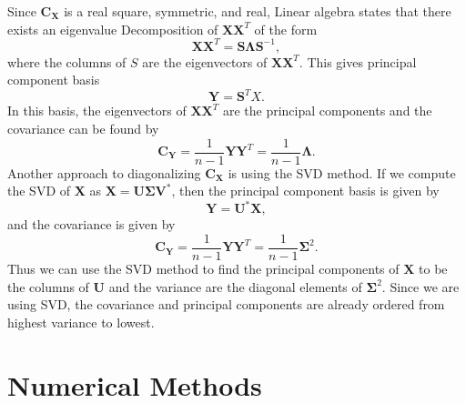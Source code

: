 \documentclass[12pt]{article}%
\begin{document}
Since $\mathbf{C}_\mathbf{X}$ is a real square, symmetric, and real, Linear algebra states that there exists an eigenvalue Decomposition of $\mathbf{X}\mathbf{X}^T$ of the form
\begin{equation}
    \mathbf{X}\mathbf{X}^T = \mathbf{S}\mathbf{\Lambda}\mathbf{S}^{-1},
\end{equation}
where the columns of $S$ are the eigenvectors of $\mathbf{X}\mathbf{X}^T$. This gives principal component basis
\begin{equation}
    \mathbf{Y} = \mathbf{S}^TX.
\end{equation}
In this basis, the eigenvectors of $\mathbf{X}\mathbf{X}^T$ are the principal components and the covariance can be found by 
\begin{equation}
    \mathbf{C}_\mathbf{Y} = \frac{1}{n-1}\mathbf{Y}\mathbf{Y}^T = \frac{1}{n-1}\mathbf{\Lambda}.
\end{equation}
Another approach to diagonalizing $\mathbf{C}_\mathbf{X}$ is using the SVD method. If we compute the SVD of $\mathbf{X}$ as $\mathbf{X} = \mathbf{U}\mathbf{\Sigma}\mathbf{V}^*$, then the principal component basis is given by 
\begin{equation}
    \mathbf{Y} = \mathbf{U}^*\mathbf{X},
\end{equation}
and the covariance is given by
\begin{equation}
    \mathbf{C}_\mathbf{Y} = \frac{1}{n-1}\mathbf{Y}\mathbf{Y}^T = \frac{1}{n-1}\mathbf{\Sigma}^2.
\end{equation}
Thus we can use the SVD method to find the principal components of $\mathbf{X}$ to be the columns of $\mathbf{U}$ and the variance are the diagonal elements of $\mathbf{\Sigma}^2$. Since we are using SVD, the covariance and principal components are already ordered from highest variance to lowest. 

\section{Numerical Methods}
\end{document}
